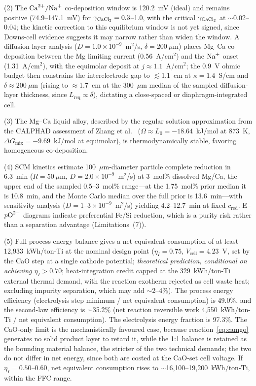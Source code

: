 \documentclass[pdflatex,sn-basic,Numbered]{sn-jnl}
\begin{document}
(2) The $\ce{Ca^{2+}/Na+}$ co-deposition window is 120.2~mV (ideal) and remains positive (74.9--147.1~mV) for $\gamma_{\ce{CaCl2}} = 0.3$--1.0, with the critical $\gamma_{\ce{CaCl2}}$ at $\sim$0.02--0.04; the kinetic correction to this equilibrium window is not yet signed, since Downs-cell evidence suggests it may narrow rather than widen the window. A diffusion-layer analysis ($D = 1.0\times10^{-9}$~m$^2$/s, $\delta = 200~\mu$m) places Mg--Ca co-deposition between the Mg limiting current (0.56~A/cm$^2$) and the $\ce{Na+}$ onset (1.31~A/cm$^2$), with the equimolar deposit at $j \approx 1.1$~A/cm$^2$; the 0.9~V ohmic budget then constrains the interelectrode gap to $\lesssim$1.1~cm at $\kappa = 1.4$~S/cm and $\delta \approx 200~\mu$m (rising to $\approx$1.7~cm at the 300~$\mu$m median of the sampled diffusion-layer thickness, since $L_{\mathrm{req}} \propto \delta$), dictating a close-spaced or diaphragm-integrated cell.

(3) The Mg--Ca liquid alloy, described by the regular solution approximation from the CALPHAD assessment of Zhang et al.\ \cite{zhang2008mgce} ($\Omega \approx L_0 = -18.64$~kJ/mol at 873~K, $\Delta G_{\mathrm{mix}} = -9.69$~kJ/mol at equimolar), is thermodynamically stable, favoring homogeneous co-deposition.

(4) SCM kinetics estimate 100~$\mu$m-diameter particle complete reduction in 6.3~min ($R = 50~\mu$m, $D = 2.0\times10^{-9}$~m$^2$/s) at 3~mol\% dissolved Mg/Ca, the upper end of the sampled 0.5--3~mol\% range---at the 1.75~mol\% prior median it is 10.8~min, and the Monte Carlo median over the full prior is 13.6~min---with sensitivity analysis ($D = 1$--$3\times10^{-9}$~m$^2$/s) yielding 4.2--12.7~min at fixed $c_{\mathrm{red}}$. E--$p\ce{O^{2-}}$ diagrams indicate preferential Fe/Si reduction, which is a purity risk rather than a separation advantage (Limitations~(7)).

(5) Full-process energy balance gives a net equivalent consumption of at least 12{,}933~kWh/ton-Ti at the nominal design point ($\eta_I = 0.75$, $V_{\mathrm{cell}} = 4.23$~V, set by the CaO step at a single cathode potential; \emph{theoretical prediction, conditional on achieving $\eta_I > 0.70$}; heat-integration credit capped at the 329~kWh/ton-Ti external thermal demand, with the reaction exotherm rejected as cell waste heat; excluding impurity separation, which may add $\sim$2--4\%). The process energy efficiency (electrolysis step minimum / net equivalent consumption) is 49.0\%, and the second-law efficiency is $\sim$35.2\% (net reaction reversible work 4{,}550~kWh/ton-Ti / net equivalent consumption). The electrolysis energy fraction is 97.3\%. The CaO-only limit is the mechanistically favoured case, because reaction~\ref{eq:camgo} generates no solid product layer to retard it, while the 1:1 balance is retained as the bounding material balance, the stricter of the two technical demands; the two do not differ in net energy, since both are costed at the CaO-set cell voltage. If $\eta_I = 0.50$--0.60, net equivalent consumption rises to $\sim$16{,}100--19{,}200~kWh/ton-Ti, within the FFC range.
\end{document}
